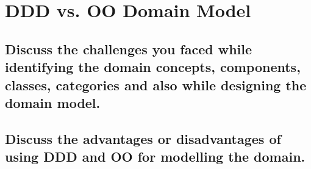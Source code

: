 \section{DDD vs. OO Domain Model}
		
		\subsection{Discuss the challenges you faced while identifying the domain concepts,
			components, classes, categories and also while designing the domain model.}
		
		\subsection{Discuss the advantages or disadvantages of using DDD and OO for modelling
			the domain.}